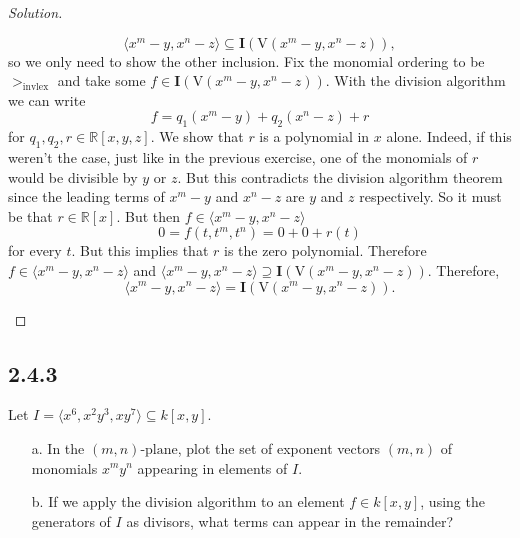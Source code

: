 \documentclass[]{article}
\newcommand\<{\langle}
\renewcommand\>{\rangle}
\newcommand{\RR}{\ensuremath{\mathbb{R}}}
\newenvironment{solution}
{
	\begin{proof}[Solution] \text{ }
		\\
	}
	{
	\end{proof}
}
\begin{document}
\begin{solution}
\begin{enumerate}
		$$
			\<x^m - y, x^n - z\> \subseteq \textbf{I}\left(\text{V}\left(x^m - y, x^n - z\right)\right),
		$$
		so we only need to show the other inclusion. Fix the monomial ordering to be $>_\text{invlex}$ and take some $f \in \textbf{I}\left(\text{V}\left(x^m - y, x^n - z\right)\right)$. With the division algorithm we can write
		$$
			f = q_1\left(x^m - y\right) + q_2\left(x^n - z\right) + r
		$$
		for $q_1, q_2, r \in \RR[x,y,z]$. We show that $r$ is a polynomial in $x$ alone. Indeed, if this weren't the case, just like in the previous exercise, one of the monomials of $r$ would be divisible by $y$ or $z$. But this contradicts the division algorithm theorem since the leading terms of $x^m - y$ and $x^n - z$ are $y$ and $z$ respectively. So it must be that $r \in \RR[x]$. But then $f \in \<x^m - y, x^n - z\>$
		$$
			0 = f(t, t^m, t^n) = 0 + 0 + r(t)
		$$
		for every $t$. But this implies that $r$ is the zero polynomial. Therefore $f \in \<x^m - y, x^n - z\>$ and $\<x^m - y, x^n - z\> \supseteq \textbf{I}\left(\text{V}\left(x^m - y, x^n - z\right)\right)$. Therefore,
		$$
			\<x^m - y, x^n - z\> = \textbf{I}\left(\text{V}\left(x^m - y, x^n - z\right)\right).
		$$
	\end{enumerate}
\end{solution}

\subsection*{2.4.3} Let $I = \<x^6, x^2y^3,xy^7\> \subseteq k[x,y].$
\begin{enumerate}
	\item[a.] In the $(m, n)\text{-plane}$, plot the set of exponent vectors $\left(m,n\right)$ of monomials $x^my^n$ appearing in elements of $I$.
	\item[b.] If we apply the division algorithm to an element $f \in k[x,y]$, using the generators of $I$ as divisors, what terms can appear in the remainder?
\end{enumerate}
\end{document}
